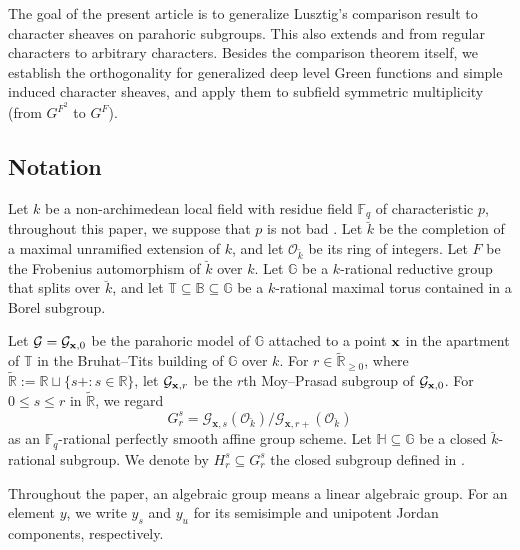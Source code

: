 \documentclass[11pt,letterpaper]{amsart}
\def\brk{{\breve k}}
\theoremstyle{definition}
\numberwithin{equation}{section}
\numberwithin{theorem}{section}
\begin{document}
The goal of the present article is to generalize Lusztig's comparison
result \cite{Lu90} to character sheaves on
parahoric subgroups.  This also extends \cite[Theorem C]{BC24} and
\cite[Theorem 1.4]{INY25} from regular characters to arbitrary characters.
Besides the comparison theorem itself, we establish the orthogonality for generalized deep level Green functions and
simple induced character sheaves, and apply them to subfield
symmetric multiplicity \cite{LusztigF2,Shoji07}
(from $G^{F^2}$ to $G^F$).

\subsection{Notation}
Let $k$ be a non-archimedean local field with residue field
$\mathbb{F}_q$ of characteristic $p$, throughout this paper, we suppose that $p$ is not bad \cite[\S 1]{Yu26}. Let $\brk$ be the completion of a
maximal unramified extension of $k$, and let $\mathcal{O}_{\brk}$ be its
ring of integers. Let $F$ be the Frobenius automorphism of $\brk$ over
$k$. Let $\mathbb{G}$ be a $k$-rational reductive group that splits over
$\brk$, and let $\mathbb T\subseteq\mathbb B\subseteq\mathbb G$ be a
$k$-rational maximal torus contained in a Borel subgroup.

Let $\mathcal{G}=\mathcal{G}_{{\bf x},0}$ be the parahoric model of
$\mathbb G$ attached to a point ${\bf x}$ in the apartment of $\mathbb T$
in the Bruhat--Tits building of $\mathbb G$ over $k$. For
$r\in\widetilde{\mathbb{R}}_{\geq0}$, where
$\widetilde{\mathbb{R}}:=\mathbb{R}\sqcup\{s+:s\in\mathbb{R}\}$, let
$\mathcal{G}_{{\bf x},r}$ be the $r$th Moy--Prasad subgroup of
$\mathcal{G}_{{\bf x},0}$. For $0\leq s\leq r$ in
$\widetilde{\mathbb{R}}$, we regard
\[
G^s_r=\mathcal{G}_{\mathbf{x},s}(\mathcal{O}_{\brk})/
      \mathcal{G}_{\mathbf{x},r+}(\mathcal{O}_{\brk})
\]
as an $\mathbb{F}_q$-rational perfectly smooth affine group scheme. Let
$\mathbb{H}\subseteq\mathbb{G}$ be a closed $\brk$-rational subgroup.
We denote by $H_r^s\subseteq G_r^s$ the closed subgroup defined in
\cite[\S 2.6]{CI_MPDL}.

Throughout the paper, an algebraic group means a linear algebraic
group.  For an element \(y\), we write \(y_s\) and \(y_u\) for its
semisimple and unipotent Jordan components, respectively.
\end{document}
